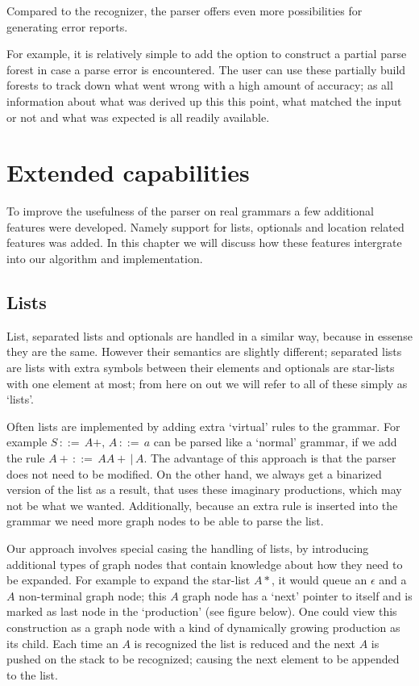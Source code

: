 \documentclass[a4paper,10pt]{article}
\begin{document}
Compared to the recognizer, the parser offers even more possibilities for generating error reports.

For example, it is relatively simple to add the option to construct a partial parse forest in case a parse error is encountered. The user can use these partially build forests to track down what went wrong with a high amount of accuracy; as all information about what was derived up this this point, what matched the input or not and what was expected is all readily available.

\section{Extended capabilities}

To improve the usefulness of the parser on real grammars a few additional features were developed. Namely support for lists, optionals and location related features was added. In this chapter we will discuss how these features intergrate into our algorithm and implementation.

\subsection{Lists}

List, separated lists and optionals are handled in a similar way, because in essense they are the same. However their semantics are slightly different; separated lists are lists with extra symbols between their elements and optionals are star-lists with one element at most; from here on out we will refer to all of these simply as `lists'.

Often lists are implemented by adding extra `virtual' rules to the grammar. For example $S\,::=\,A+,\,A\,::=\,a$ can be parsed like a `normal' grammar, if we add the rule $A+\,::=\,AA+\,|\,A$. The advantage of this approach is that the parser does not need to be modified. On the other hand, we always get a binarized version of the list as a result, that uses these imaginary productions, which may not be what we wanted. Additionally, because an extra rule is inserted into the grammar we need more graph nodes to be able to parse the list.

Our approach involves special casing the handling of lists, by introducing additional types of graph nodes that contain knowledge about how they need to be expanded. For example to expand the star-list $A*$, it would queue an $\epsilon$ and a $A$ non-terminal graph node; this $A$ graph node has a `next' pointer to itself and is marked as last node in the `production' (see figure below). One could view this construction as a graph node with a kind of dynamically growing production as its child. Each time an $A$ is recognized the list is reduced and the next $A$ is pushed on the stack to be recognized; causing the next element to be appended to the list.
\end{document}

